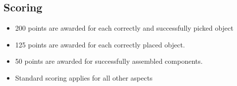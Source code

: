 \subsection{Scoring}
\begin{itemize}
	\item 200 points are awarded for each correctly and successfully picked object
	\item 125 points are awarded for each correctly placed object.
	\item 50 points are awarded for successfully assembled components.
	\item Standard scoring applies for all other aspects
\end{itemize}

